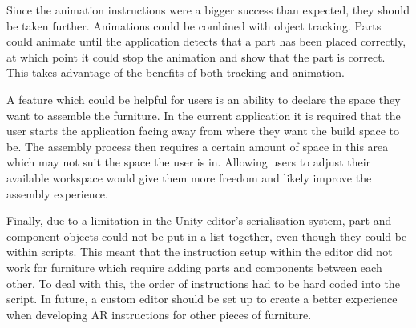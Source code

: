 \documentclass{l4proj}
\begin{document}
Since the animation instructions were a bigger success than expected, they should be taken further. Animations could be combined with object tracking. Parts could animate until the application detects that a part has been placed correctly, at which point it could stop the animation and show that the part is correct. This takes advantage of the benefits of both tracking and animation.

A feature which could be helpful for users is an ability to declare the space they want to assemble the furniture. In the current application it is required that the user starts the application facing away from where they want the build space to be. The assembly process then requires a certain amount of space in this area which may not suit the space the user is in. Allowing users to adjust their available workspace would give them more freedom and likely improve the assembly experience.

Finally, due to a limitation in the Unity editor's serialisation system, part and component objects could not be put in a list together, even though they could be within scripts. This meant that the instruction setup within the editor did not work for furniture which require adding parts and components between each other. To deal with this, the order of instructions had to be hard coded into the script. In future, a custom editor should be set up to create a better experience when developing AR instructions for other pieces of furniture.

%
% 
\end{document}
